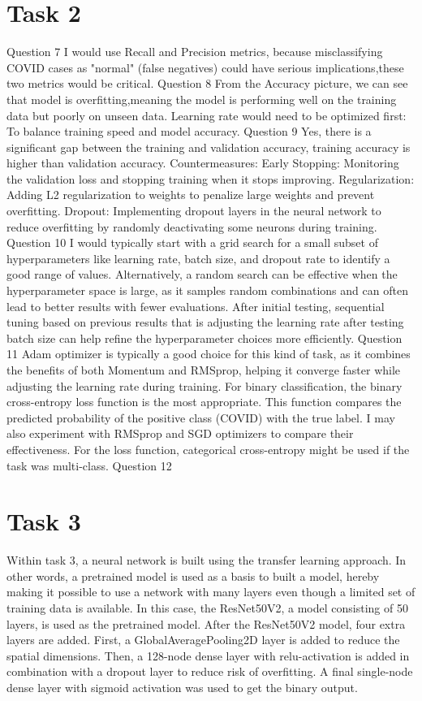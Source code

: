\documentclass[conference]{IEEEtran}
\begin{document}
\section{Task 2}
Question 7
I would use Recall and Precision metrics, because misclassifying COVID cases as "normal" (false negatives) could have serious implications,these two metrics would be critical.
Question 8
From the Accuracy picture, we can see that model is overfitting,meaning the model is performing well on the training data but poorly on unseen data. Learning rate would need to be optimized first: To balance training speed and model accuracy.
Question 9
Yes, there is a significant gap between the training and validation accuracy, training accuracy is higher than validation accuracy.
Countermeasures:
Early Stopping: Monitoring the validation loss and stopping training when it stops improving.
Regularization: Adding L2 regularization to weights to penalize large weights and prevent overfitting.
Dropout: Implementing dropout layers in the neural network to reduce overfitting by randomly deactivating some neurons during training.
Question 10
I would typically start with a grid search for a small subset of hyperparameters like learning rate, batch size, and dropout rate to identify a good range of values.
Alternatively, a random search can be effective when the hyperparameter space is large, as it samples random combinations and can often lead to better results with fewer evaluations.
After initial testing, sequential tuning based on previous results that is adjusting the learning rate after testing batch size can help refine the hyperparameter choices more efficiently.
Question 11
Adam optimizer is typically a good choice for this kind of task, as it combines the benefits of both Momentum and RMSprop, helping it converge faster while adjusting the learning rate during training.
For binary classification, the binary cross-entropy loss function is the most appropriate. This function compares the predicted probability of the positive class (COVID) with the true label.
I may also experiment with RMSprop and SGD optimizers to compare their effectiveness.
For the loss function, categorical cross-entropy might be used if the task was multi-class.
Question 12


\section{Task 3}

Within task 3, a neural network is built using the transfer learning approach. In other words, a pretrained model is used as a basis to built a model, hereby making it possible to use a network with many layers even though a limited set of training data is available. 
In this case, the ResNet50V2, a model consisting of 50 layers, is used as the pretrained model. After the ResNet50V2 model, four extra layers are added. First, a GlobalAveragePooling2D layer is added to reduce the spatial dimensions. Then, a 128-node dense layer with relu-activation is added in combination with a dropout layer to reduce risk of overfitting. A final single-node dense layer with sigmoid activation was used to get the binary output.
\end{document}
